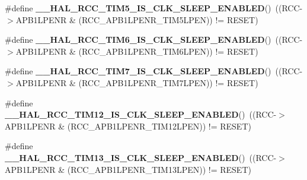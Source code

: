 \begin{DoxyCompactItemize}
\mbox{\label{group___r_c_c___clock___sleep___enable___disable___status_gaa32ba6dea54de9af4f8f9eaadbd90df8}} 
\#define {\bfseries \+\_\+\+\_\+\+H\+A\+L\+\_\+\+R\+C\+C\+\_\+\+T\+I\+M5\+\_\+\+I\+S\+\_\+\+C\+L\+K\+\_\+\+S\+L\+E\+E\+P\+\_\+\+E\+N\+A\+B\+L\+ED}()~((R\+CC-\/$>$A\+P\+B1\+L\+P\+E\+NR \& (R\+C\+C\+\_\+\+A\+P\+B1\+L\+P\+E\+N\+R\+\_\+\+T\+I\+M5\+L\+P\+EN)) != R\+E\+S\+ET)
\item 
\mbox{\label{group___r_c_c___clock___sleep___enable___disable___status_ga8d5d8a349946a4c0698d754ee107c3cf}} 
\#define {\bfseries \+\_\+\+\_\+\+H\+A\+L\+\_\+\+R\+C\+C\+\_\+\+T\+I\+M6\+\_\+\+I\+S\+\_\+\+C\+L\+K\+\_\+\+S\+L\+E\+E\+P\+\_\+\+E\+N\+A\+B\+L\+ED}()~((R\+CC-\/$>$A\+P\+B1\+L\+P\+E\+NR \& (R\+C\+C\+\_\+\+A\+P\+B1\+L\+P\+E\+N\+R\+\_\+\+T\+I\+M6\+L\+P\+EN)) != R\+E\+S\+ET)
\item 
\mbox{\label{group___r_c_c___clock___sleep___enable___disable___status_gab1c825aefb8ae4ab199150ce061e7a8e}} 
\#define {\bfseries \+\_\+\+\_\+\+H\+A\+L\+\_\+\+R\+C\+C\+\_\+\+T\+I\+M7\+\_\+\+I\+S\+\_\+\+C\+L\+K\+\_\+\+S\+L\+E\+E\+P\+\_\+\+E\+N\+A\+B\+L\+ED}()~((R\+CC-\/$>$A\+P\+B1\+L\+P\+E\+NR \& (R\+C\+C\+\_\+\+A\+P\+B1\+L\+P\+E\+N\+R\+\_\+\+T\+I\+M7\+L\+P\+EN)) != R\+E\+S\+ET)
\item 
\mbox{\label{group___r_c_c___clock___sleep___enable___disable___status_gac4317d5e98fb245f87ecea642732c7fd}} 
\#define {\bfseries \+\_\+\+\_\+\+H\+A\+L\+\_\+\+R\+C\+C\+\_\+\+T\+I\+M12\+\_\+\+I\+S\+\_\+\+C\+L\+K\+\_\+\+S\+L\+E\+E\+P\+\_\+\+E\+N\+A\+B\+L\+ED}()~((R\+CC-\/$>$A\+P\+B1\+L\+P\+E\+NR \& (R\+C\+C\+\_\+\+A\+P\+B1\+L\+P\+E\+N\+R\+\_\+\+T\+I\+M12\+L\+P\+EN)) != R\+E\+S\+ET)
\item 
\mbox{\label{group___r_c_c___clock___sleep___enable___disable___status_ga800d326a63101506b52340cc38990f8c}} 
\#define {\bfseries \+\_\+\+\_\+\+H\+A\+L\+\_\+\+R\+C\+C\+\_\+\+T\+I\+M13\+\_\+\+I\+S\+\_\+\+C\+L\+K\+\_\+\+S\+L\+E\+E\+P\+\_\+\+E\+N\+A\+B\+L\+ED}()~((R\+CC-\/$>$A\+P\+B1\+L\+P\+E\+NR \& (R\+C\+C\+\_\+\+A\+P\+B1\+L\+P\+E\+N\+R\+\_\+\+T\+I\+M13\+L\+P\+EN)) != R\+E\+S\+ET)

\end{DoxyCompactItemize}
